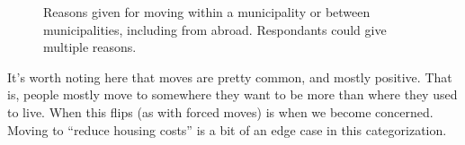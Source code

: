 \documentclass[
  letterpaper,
]{article}
\begin{document}
\begin{figure}[H]


\caption{\label{fig-reason-for-last-move}Reasons given for moving within
a municipality or between municipalities, including from abroad.
Respondants could give multiple reasons.}

\end{figure}%

It's worth noting here that moves are pretty common, and mostly
positive. That is, people mostly move to somewhere they want to be more
than where they used to live. When this flips (as with forced moves) is
when we become concerned. Moving to ``reduce housing costs'' is a bit of
an edge case in this categorization.
\end{document}
